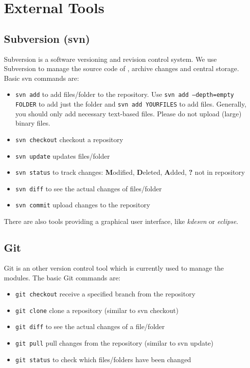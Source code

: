 \section{External Tools}
\label{sc_externaltools}

\subsection{Subversion (svn)}
Subversion is a software versioning and revision control system. We use Subversion to
manage the source code of \Dumux, archive changes and central storage.
Basic svn commands are:
\begin{itemize}
  \item \texttt{svn add} to add files/folder to the repository.
        Use \texttt{svn add --depth=empty FOLDER} to add just the folder
        and \texttt{svn add YOURFILES} to add files. Generally, you should only add
        necessary text-based files. Please do not upload (large) binary files.
  \item \texttt{svn checkout} checkout a repository
  \item \texttt{svn update} updates files/folder
  \item \texttt{svn status} to track changes:
        \textbf{M}odified, \textbf{D}eleted, \textbf{A}dded, \textbf{?} not in repository
  \item \texttt{svn diff} to see the actual changes of files/folder
  \item \texttt{svn commit} upload changes to the repository
\end{itemize}
There are also tools providing a graphical user interface, like \emph{kdesvn} or \emph{eclipse}.

\subsection{Git}
Git is an other version control tool which is currently used to manage the \Dune modules.
The basic Git commands are:
\begin{itemize}
  \item \texttt{git checkout} receive a specified branch from the repository
  \item \texttt{git clone} clone a repository (similar to svn checkout)
  \item \texttt{git diff} to see the actual changes of a file/folder
  \item \texttt{git pull} pull changes from the repository (similar to svn update)
  \item \texttt{git status} to check which files/folders have been changed
\end{itemize}


